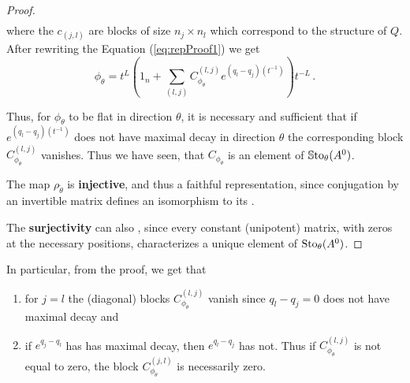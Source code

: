 \begin{proof}
\begin{align*}
  \end{align*}
  where the $c_{(j,l)}$ are blocks of size $n_j\times n_l$ which correspond to the structure of
  $Q$. After rewriting the Equation (\ref{eq:repProof1}) we get
  \[
    \phi_\theta=
      t^L\left(
        1_n+\sum_{(l,j)}C_{\phi_\theta}^{(l,j)}e^{(q_l-q_j)(t^{-1})}
      \right)t^{-L} \,.
  \]
  \begin{comment}
    \begin{align*}
      \phi_\theta(t)
      &=t^Le^{Q(t^{-1})}\left(
        1_n+C_{\phi_\theta}
      \right)e^{-Q(t^{-1})}t^{-L}
    \\&=t^Le^{Q(t^{-1})}\left(
        1_n+\sum_{(l,j)}C_{\phi_\theta}^{(l,j)}
      \right)e^{-Q(t^{-1})}t^{-L}
    \\&=t^L\left(
        1_n+\sum_{(l,j)}e^{Q(t^{-1})}C_{\phi_\theta}^{(l,j)}e^{-Q(t^{-1})}
      \right)t^{-L}
    \\&=t^L\left(
          1_n+\sum_{(l,j)}C_{\phi_\theta}^{(l,j)}e^{(q_l-q_j)(t^{-1})}
        \right)t^{-L} \,.
    \end{align*}
  \end{comment}
  Thus, for $\phi_{\theta}$ to be flat in direction $\theta$, it is
  necessary and sufficient that if $e^{(q_l-q_j)(t^{-1})}$ does not have
  maximal decay in direction $\theta$ the corresponding
  block $C_{\phi_\theta}^{(l,j)}$ vanishes.
  Thus we have seen, that $C_{\phi_\theta}$ is an
  element of $\operatorname{\mathbb{S}to}_\theta(A^0)$.

  The map $\rho_{\tilde\theta}$ is \textbf{injective}, and thus a faithful
  representation, since conjugation by an invertible matrix defines an
  isomorphism to its .

  The \textbf{surjectivity} can also , since every
  constant (unipotent) matrix, with zeros at the necessary positions,
  characterizes a unique element of $\operatorname{Sto}_\theta(A^0)$.
  \TODO[Isomorphic to $\C^{?}$?]
\end{proof}

In particular, from the proof, we get that
\begin{enumerate}
  \item for $j=l$ the (diagonal) blocks $C_{\phi_\theta}^{(l,j)}$ vanish since
    $q_l-q_j=0$ does not have maximal decay and
  \item if $e^{q_j-q_l}$ has has maximal decay, then $e^{q_l-q_j}$ has not.
    Thus if $C_{\phi_\theta}^{(l,j)}$ is not equal to zero, the block
    $C_{\phi_\theta}^{(j,l)}$ is necessarily zero.
\end{enumerate}
\begin{comment}
  \begin{rem}
    This implies that the matrix $C_{\phi_\theta}$ is unipotent, and
    \rewrite{hence is $\Sto_\theta(A^0)$ is a unipotent Lie group.}
  \end{rem}
\end{comment}

